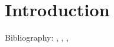 \section{Introduction}

Bibliography: \cite{Klein2006}, \cite{Remple2006}, \cite{Morelli2011}, \cite{Morelli2011a}
